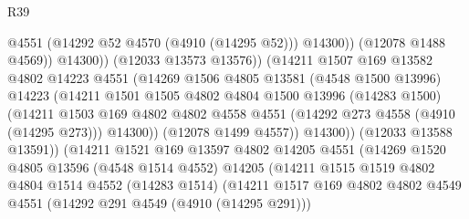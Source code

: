 \begin{lexlean}{R39}
\begin{coremodule}
                                      @4551
                                      (@14292 @52 @4570 (@4910 (@14295 @52)))
                                      @14300))
                                  (@12078 @1488 @4569))
                                @14300))
                            (@12033 @13573 @13576))
                          (@14211
                            @1507
                            @169
                            @13582
                            @4802
                            @14223
                            @4551
                            (@14269
                              @1506
                              @4805
                              @13581
                              (@4548 @1500 @13996)
                              @14223
                              (@14211
                                @1501
                                @1505
                                @4802
                                @4804
                                @1500
                                @13996
                                (@14283 @1500)
                                (@14211
                                  @1503
                                  @169
                                  @4802
                                  @4802
                                  @4558
                                  @4551
                                  (@14292 @273 @4558 (@4910 (@14295 @273)))
                                  @14300))
                              (@12078 @1499 @4557))
                            @14300))
                        (@12033 @13588 @13591))
                      (@14211
                        @1521
                        @169
                        @13597
                        @4802
                        @14205
                        @4551
                        (@14269
                          @1520
                          @4805
                          @13596
                          (@4548 @1514 @4552)
                          @14205
                          (@14211
                            @1515
                            @1519
                            @4802
                            @4804
                            @1514
                            @4552
                            (@14283 @1514)
                            (@14211
                              @1517
                              @169
                              @4802
                              @4802
                              @4549
                              @4551
                              (@14292 @291 @4549 (@4910 (@14295 @291)))

\end{coremodule}
\end{lexlean}

